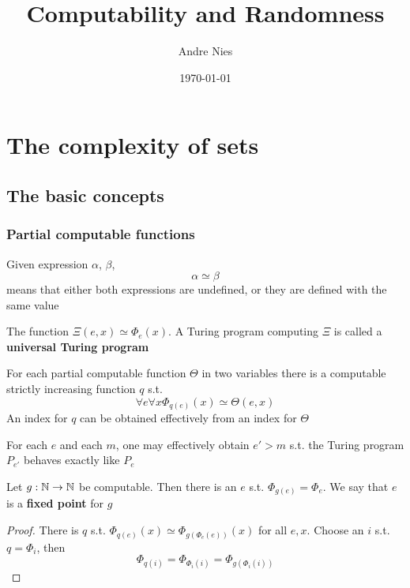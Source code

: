\documentclass[11pt]{article}
\author{Andre Nies}
\date{\today}
\title{Computability and Randomness}
\begin{document}
\maketitle
\tableofcontents


\section{The complexity of sets}
\label{sec:orgd0606ef}
\subsection{The basic concepts}
\label{sec:orgb88f418}
\subsubsection{Partial computable functions}
\label{sec:org36cc994}
Given expression \(\alpha\), \(\beta\),
\begin{equation*}
\alpha\simeq\beta
\end{equation*}
means that either both expressions are undefined, or they are defined with the same value

The function \(\Xi(e,x)\simeq\Phi_e(x)\). A Turing program computing \(\Xi\) is called a \textbf{universal Turing program}

\begin{theorem}
For each partial computable function \(\Theta\) in two variables there is a computable strictly
increasing function \(q\) s.t.
\begin{equation*}
\forall e\forall x\Phi_{q(e)}(x)\simeq\Theta(e,x)
\end{equation*}
An index for \(q\) can be obtained effectively from an index for \(\Theta\)
\end{theorem}

\begin{lemma}
For each \(e\) and each \(m\), one may effectively obtain \(e'>m\) s.t. the Turing
program \(P_{e'}\) behaves exactly like \(P_e\)
\end{lemma}

\begin{theorem}
\label{1.1.5}
Let \(g:\mathbb{N}\to\mathbb{N}\) be computable. Then there is an \(e\) s.t. \(\Phi_{g(e)}=\Phi_e\). We say that \(e\) is a
\textbf{fixed point} for \(g\)
\end{theorem}

\begin{proof}
There is \(q\) s.t. \(\Phi_{q(e)}(x)\simeq\Phi_{g(\Phi_e(e))}(x)\) for all \(e,x\). Choose an \(i\)
s.t. \(q=\Phi_i\), then
\begin{equation*}
\Phi_{q(i)}=\Phi_{\Phi_i(i)}=\Phi_{g(\Phi_i(i))}
\end{equation*}
\end{proof}
\end{document}
